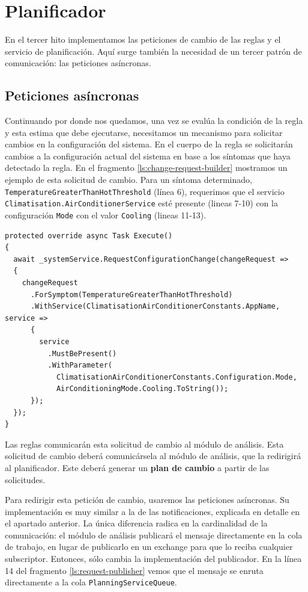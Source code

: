 \section{Planificador}

En el tercer hito implementamos las peticiones de cambio de las reglas y el servicio de planificación. Aquí surge también la necesidad de un tercer patrón de comunicación: las peticiones asíncronas.

\subsection{Peticiones asíncronas}

Continuando por donde nos quedamos, una vez se evalúa la condición de la regla y esta estima que debe ejecutarse, necesitamos un mecanismo para solicitar cambios en la configuración del sistema. En el cuerpo de la regla se solicitarán cambios a la configuración actual del sistema en base a los síntomas que haya detectado la regla. En el fragmento \ref{ls:change-request-builder} mostramos un ejemplo de esta solicitud de cambio. Para un síntoma determinado, \texttt{TemperatureGreaterThanHotThreshold} (línea 6), requerimos que el servicio \texttt{Climatisation.AirConditionerService} esté presente (lineas 7-10) con la configuración \texttt{Mode} con el valor \texttt{Cooling} (lineas 11-13).

\begin{lstlisting}[language={[Sharp]C},caption={Implementación de la misma petición siguiendo el patrón \emph{builder}.},captionpos=b, label=ls:change-request-builder]
protected override async Task Execute()
{
  await _systemService.RequestConfigurationChange(changeRequest =>
  {
    changeRequest
      .ForSymptom(TemperatureGreaterThanHotThreshold)
      .WithService(ClimatisationAirConditionerConstants.AppName, service =>
      {
        service
          .MustBePresent()
          .WithParameter(
            ClimatisationAirConditionerConstants.Configuration.Mode,
            AirConditioningMode.Cooling.ToString());
      });
  });
}
\end{lstlisting}

Las reglas comunicarán esta solicitud de cambio al módulo de análisis. Esta solicitud de cambio deberá comunicársela al módulo de análisis, que la redirigirá al planificador. Este deberá generar un \textbf{plan de cambio} a partir de las solicitudes.

Para redirigir esta petición de cambio, usaremos las peticiones asíncronas. Su implementación es muy similar a la de las notificaciones, explicada en detalle en el apartado anterior. La única diferencia radica en la cardinalidad de la comunicación: el módulo de análisis publicará el mensaje directamente en la cola de trabajo, en lugar de publicarlo en un exchange para que lo reciba cualquier subscriptor. Entonces, sólo cambia la implementación del publicador. En la línea 14 del fragmento \ref{ls:request-publisher} vemos que el mensaje se enruta directamente a la cola \texttt{PlanningServiceQueue}.


